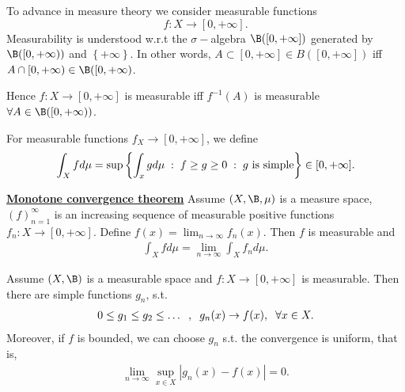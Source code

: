 To advance in measure theory we consider measurable functions $$f:X\rightarrow [0,+\infty].$$ Measurability is understood w.r.t the $\sigma-$algebra
 $\B([0,+\infty])$ generated by $\B(\left[0,+\infty\right))$ and $\left\{+\infty\right\}$. In other words, $A\subset[0,+\infty]\in B([0,+\infty])$ iff $A\cap [0,+\infty)\in \B([0,+\infty)$.
\begin{remark}
    Hence $f:X\rightarrow [0,+\infty]$ is measurable iff $f^{-1}(A)$ is measurable $\forall A\in \B([0,+\infty))$.
\end{remark}

\begin{definition}
    For measurable functions $f_X\rightarrow [0,+\infty]$, we define \begin{align}
        \int_X fd\mu = \sup\left\{\int_xgd\mu \hspace{1mm}:\hspace{1mm} f\geq g\geq 0\hspace{1mm}:\hspace{1mm} g \text{ is simple}\right\}\in[0,+\infty].
    \end{align}
\end{definition}

\begin{theorem}{\underline{\textbf{Monotone convergence theorem}}}
    Assume $(X,\B,\mu)$ is a measure space, $(f)_{n=1}^\infty$ is an increasing sequence of measurable positive functions $f_n:X\rightarrow [0,+\infty]$. Define $f(x)=\lim_{n\rightarrow \infty}f_n(x)$. 
    Then $f$ is measurable and  \begin{align}
        \int_X fd\mu = \lim_{n\rightarrow \infty} \int_X f_nd\mu.
    \end{align}
    
\end{theorem}

\begin{theorem}
    Assume $(X,\B)$ is a measurable space and $f:X\rightarrow [0,+\infty]$ is measurable. Then there are simple functions $g_n$, s.t. \begin{align*}
        0\leq g_1\leq g_2\leq\ldots \hspace{2mm},\hspace{2mm} g_n(x)\rightarrow f(x),\hspace{2mm}\forall x\in X.
    \end{align*}
    Moreover, if $f$ is bounded, we can choose $g_n$ s.t. the convergence is uniform, that is, \begin{align}
        \lim_{n\rightarrow\infty}\sup_{x\in X}|g_n(x)-f(x)|=0.
    \end{align}
\end{theorem}